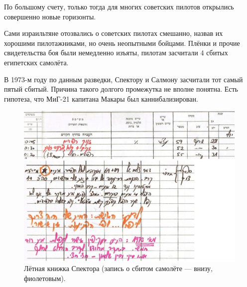 По большому счету, только тогда для многих советских пилотов открылись совершенно новые горизонты.

Сами израильтяне отозвались о советских пилотах смешанно, назвав их хорошими пилотажниками, но очень неопытными бойцами. Плёнки и прочие свидетельства боя были немедленно изъяты, пилотам засчитали 4 сбитых египетских самолёта.

В 1973-м году по данным разведки, Спектору и Салмону засчитали тот самый пятый сбитый. Причина такого долгого промежутка не вполне понятна. Есть гипотеза, что МиГ-21 капитана Макары был каннибализирован.

\begin{figure}[h!tb] 
	\centering\includegraphics[scale=0.25]{Dolina_5/AuXZifeT9e0.jpg}
	\caption{Лётная книжка Спектора (запись о сбитом самолёте — внизу, фиолетовым).}%
\end{figure}

